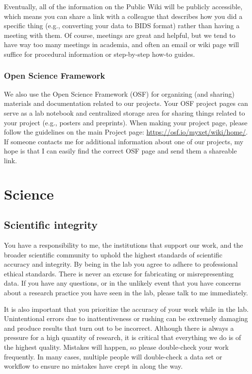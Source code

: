 \documentclass[letterpaper,12pt,oneside]{memoir}
\begin{document}
Eventually, all of the information on the Public Wiki will be publicly accessible, which means you can share a link with a colleague that describes how you did a specific thing (e.g., converting your data to BIDS format) rather than having a meeting with them. Of course, meetings are great and helpful, but we tend to have way too many meetings in academia, and often an email or wiki page will suffice for procedural information or step-by-step how-to guides. 

\subsection{Open Science Framework}

We also use the Open Science Framework (OSF) for organizing (and sharing) materials and documentation related to our projects. Your OSF project pages can serve as a lab notebook and centralized storage area for sharing things related to your project (e.g., posters and preprints). When making your project page, please follow the guidelines on the main Project page: \url{https://osf.io/myxet/wiki/home/}. If someone contacts me for additional information about one of our projects, my hope is that I can easily find the correct OSF page and send them a shareable link.


\chapter{Science}

\section{Scientific integrity}

You have a responsibility to me, the institutions that support our work, and the broader scientific community to uphold the highest standards of scientific accuracy and integrity. By being in the lab you agree to adhere to professional ethical standards. There is never an excuse for fabricating or misrepresenting data. If you have any questions, or in the unlikely event that you have concerns about a research practice you have seen in the lab, please talk to me immediately.

It is also important that you prioritize the accuracy of your work while in the lab. Unintentional errors due to inattentiveness or rushing can be extremely damaging and produce results that turn out to be incorrect. Although there is always a pressure for a high quantity of research, it is critical that everything we do is of the highest quality. Mistakes will happen, so please double-check your work frequently. In many cases, multiple people will double-check a data set or workflow to ensure no mistakes have crept in along the way.
\end{document}
